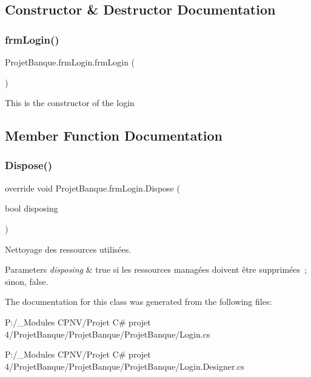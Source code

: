 \subsection{Constructor \& Destructor Documentation}
\mbox{\label{class_projet_banque_1_1frm_login_a4fcd9d1592741e07be67c4108a8e433e}} 
\subsubsection{\texorpdfstring{frmLogin()}{frmLogin()}}
{\footnotesize\ttfamily Projet\+Banque.\+frm\+Login.\+frm\+Login (\begin{DoxyParamCaption}{ }\end{DoxyParamCaption})}



This is the constructor of the login 



\subsection{Member Function Documentation}
\mbox{\label{class_projet_banque_1_1frm_login_a476b5fe8d0ef3fa86ba706a969d744b7}} 
\subsubsection{\texorpdfstring{Dispose()}{Dispose()}}
{\footnotesize\ttfamily override void Projet\+Banque.\+frm\+Login.\+Dispose (\begin{DoxyParamCaption}\item[{bool}]{disposing }\end{DoxyParamCaption})\hspace{0.3cm}{\ttfamily [protected]}}



Nettoyage des ressources utilisées. 


\begin{DoxyParams}{Parameters}
{\em disposing} & true si les ressources managées doivent être supprimées ; sinon, false.\\
\hline
\end{DoxyParams}


The documentation for this class was generated from the following files\+:\begin{DoxyCompactItemize}
\item 
P\+:/\+\_\+\+Modules C\+P\+N\+V/\+Projet C\# projet 4/\+Projet\+Banque/\+Projet\+Banque/\+Projet\+Banque/Login.\+cs\item 
P\+:/\+\_\+\+Modules C\+P\+N\+V/\+Projet C\# projet 4/\+Projet\+Banque/\+Projet\+Banque/\+Projet\+Banque/Login.\+Designer.\+cs\end{DoxyCompactItemize}
